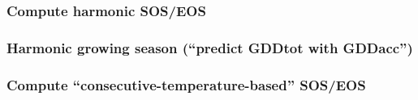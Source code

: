 \documentclass[
]{article}
\begin{document}
\hypertarget{compute-harmonic-soseos}{%
\subsubsection{Compute harmonic SOS/EOS}\label{compute-harmonic-soseos}}

\hypertarget{harmonic-growing-season-predict-gddtot-with-gddacc}{%
\subsubsection{Harmonic growing season (``predict GDDtot with
GDDacc'')}\label{harmonic-growing-season-predict-gddtot-with-gddacc}}

\hypertarget{compute-consecutive-temperature-based-soseos}{%
\subsubsection{Compute ``consecutive-temperature-based''
SOS/EOS}\label{compute-consecutive-temperature-based-soseos}}
\end{document}
